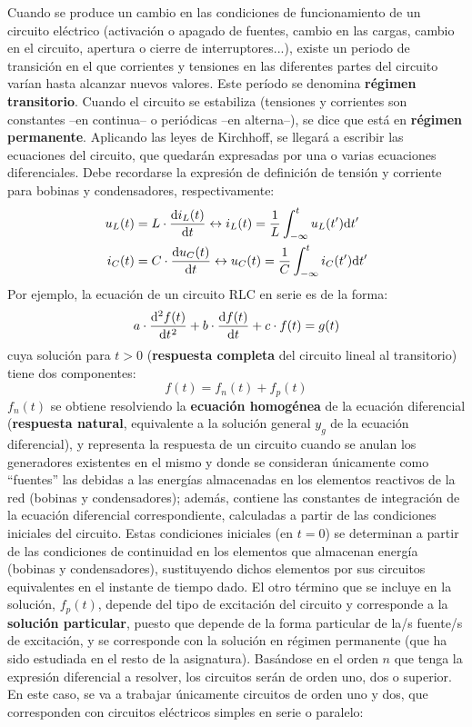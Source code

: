 \documentclass[11pt]{book} %
\numberwithin{dummy}{section}
\theoremstyle{ocrenumbox}
\theoremstyle{blacknumex}
\theoremstyle{blacknumbox}
\theoremstyle{ocrenum}
\newlength\esp
\begin{document}
	Cuando se produce un cambio en las condiciones de funcionamiento de un circuito eléctrico (activación o apagado de fuentes, cambio en las cargas, cambio en el circuito, apertura o cierre de interruptores...), existe un periodo de transición en el que corrientes y tensiones en las diferentes partes del circuito varían hasta alcanzar nuevos valores. Este período se denomina \textbf{régimen transitorio}. Cuando el circuito se estabiliza (tensiones y corrientes son constantes --en continua-- o periódicas --en alterna--), se dice que está en \textbf{régimen permanente}. Aplicando las leyes de Kirchhoff, se llegará a escribir las ecuaciones del circuito, que quedarán expresadas por una o varias ecuaciones diferenciales. Debe recordarse la expresión de definición de tensión y corriente para bobinas y condensadores, respectivamente:
	\begin{align*}
	    u_L(t) &= L \cdot \diff{i_L(t)}{t}
          \leftrightarrow
          i_L(t) = \frac{1}{L} \int^t_{-\infty}u_L(t') \mathrm{d}t'\\
          i_C(t) &= C \cdot \diff{u_C(t)}{t}
          \leftrightarrow
          u_C(t) = \frac{1}{C} \int^t_{-\infty}i_C(t') \mathrm{d}t'
	\end{align*}
	Por ejemplo, la ecuación de un circuito RLC en serie es de la forma:
\begin{equation*}
    a \cdot \diff[2]{f(t)}{t} + b \cdot \diff{f(t)}{t} + c \cdot f(t) = g(t)
\end{equation*}
cuya solución para $t > 0$ (\textbf{respuesta completa} del circuito lineal al transitorio) tiene dos componentes:
\begin{equation*}
    f(t) = f_n(t) + f_p(t)
\end{equation*}
$f_n(t)$ se obtiene resolviendo la \textbf{ecuación homogénea} de la ecuación diferencial (\textbf{respuesta natural}, equivalente a la solución general $y_g$ de la ecuación diferencial), y representa la respuesta de un circuito cuando se anulan los generadores existentes en el mismo y donde se consideran únicamente como ``fuentes'' las debidas a las energías almacenadas en los elementos reactivos de la red (bobinas y condensadores); además, contiene las constantes de integración de la ecuación diferencial correspondiente, calculadas a partir de las condiciones iniciales del circuito. Estas condiciones iniciales (en $t=0$) se determinan a partir de las condiciones de continuidad en los elementos que almacenan energía (bobinas y condensadores), sustituyendo dichos elementos por sus circuitos equivalentes en el instante de tiempo dado. El otro término que se incluye en la solución, $f_p(t)$, depende del tipo de excitación del circuito y corresponde a la \textbf{solución particular}, puesto que depende de la forma particular de la/s fuente/s de excitación, y se corresponde con la solución en régimen permanente (que ha sido estudiada en el resto de la asignatura). Basándose en el orden $n$ que tenga la expresión diferencial a resolver, los circuitos serán de orden uno, dos o superior. En este caso, se va a trabajar únicamente circuitos de orden uno y dos, que corresponden con circuitos eléctricos simples en serie o paralelo:
\end{document}
